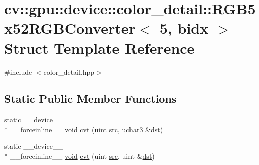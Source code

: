 \hypertarget{structcv_1_1gpu_1_1device_1_1color__detail_1_1RGB5x52RGBConverter_3_015_00_01bidx_01_4}{\section{cv\-:\-:gpu\-:\-:device\-:\-:color\-\_\-detail\-:\-:R\-G\-B5x52\-R\-G\-B\-Converter$<$ 5, bidx $>$ Struct Template Reference}
\label{structcv_1_1gpu_1_1device_1_1color__detail_1_1RGB5x52RGBConverter_3_015_00_01bidx_01_4}
}


{\ttfamily \#include $<$color\-\_\-detail.\-hpp$>$}

\subsection*{Static Public Member Functions}
\begin{DoxyCompactItemize}
\item 
static \-\_\-\-\_\-device\-\_\-\-\_\- \\*
\-\_\-\-\_\-forceinline\-\_\-\-\_\- \hyperlink{legacy_8hpp_a8bb47f092d473522721002c86c13b94e}{void} \hyperlink{structcv_1_1gpu_1_1device_1_1color__detail_1_1RGB5x52RGBConverter_3_015_00_01bidx_01_4_a7150d8547a319b7c9b93a473bd9f8d3b}{cvt} (uint \hyperlink{legacy_8hpp_a371cd109b74033bc4366f584edd3dacc}{src}, uchar3 \&\hyperlink{photo__c_8h_aed13e2a25279b24dc954073233fef7a5}{dst})
\item 
static \-\_\-\-\_\-device\-\_\-\-\_\- \\*
\-\_\-\-\_\-forceinline\-\_\-\-\_\- \hyperlink{legacy_8hpp_a8bb47f092d473522721002c86c13b94e}{void} \hyperlink{structcv_1_1gpu_1_1device_1_1color__detail_1_1RGB5x52RGBConverter_3_015_00_01bidx_01_4_a64023d7c1ee4110f124c906d9ea10ce4}{cvt} (uint \hyperlink{legacy_8hpp_a371cd109b74033bc4366f584edd3dacc}{src}, uint \&\hyperlink{photo__c_8h_aed13e2a25279b24dc954073233fef7a5}{dst})
\end{DoxyCompactItemize}



